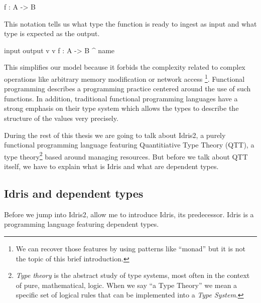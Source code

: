 \documentclass[
]{article}
\newenvironment{Shaded}{}{}
\newcommand{\DataTypeTok}[1]{\textcolor[rgb]{0.56,0.13,0.00}{#1}}
\newcommand{\NormalTok}[1]{#1}
\newcommand{\OperatorTok}[1]{\textcolor[rgb]{0.40,0.40,0.40}{#1}}
\newcommand{\OtherTok}[1]{\textcolor[rgb]{0.00,0.44,0.13}{#1}}
\begin{document}
\begin{Shaded}
\begin{Highlighting}[]
\NormalTok{f }\OperatorTok{:} \DataTypeTok{A} \OtherTok{{-}\textgreater{}} \DataTypeTok{B}
\end{Highlighting}
\end{Shaded}

This notation tells us what type the function is ready to ingest as
input and what type is expected as the output.

\begin{Shaded}
\begin{Highlighting}[]
\NormalTok{input    output}
\NormalTok{    v    v}
\NormalTok{f }\OperatorTok{:} \DataTypeTok{A} \OtherTok{{-}\textgreater{}} \DataTypeTok{B}
\OperatorTok{\^{}}
\NormalTok{name }
\end{Highlighting}
\end{Shaded}

This simplifies our model because it forbids the complexity related to
complex operations like arbitrary memory modification or network access
\footnote{We can recover those features by using patterns like ``monad''
  but it is not the topic of this brief introduction.}. Functional
programming describes a programming practice centered around the use of
such functions. In addition, traditional functional programming
languages have a strong emphasis on their type system which allows the
types to describe the structure of the values very precisely.

During the rest of this thesis we are going to talk about Idris2, a
purely functional programming language featuring Quantitiative Type
Theory (QTT), a type theory\footnote{\emph{Type theory} is the abstract
  study of type systems, most often in the context of pure,
  mathematical, logic. When we say ``a Type Theory'' we mean a specific
  set of logical rules that can be implemented into a \emph{Type
  System}.} based around managing resources. But before we talk about
QTT itself, we have to explain what is Idris and what are dependent
types.

\hypertarget{idris-and-dependent-types}{%
\subsection{Idris and dependent types}\label{idris-and-dependent-types}}

Before we jump into Idris2, allow me to introduce Idris\cite{idris1},
its predecessor. Idris is a programming language featuring dependent
types.
\end{document}
